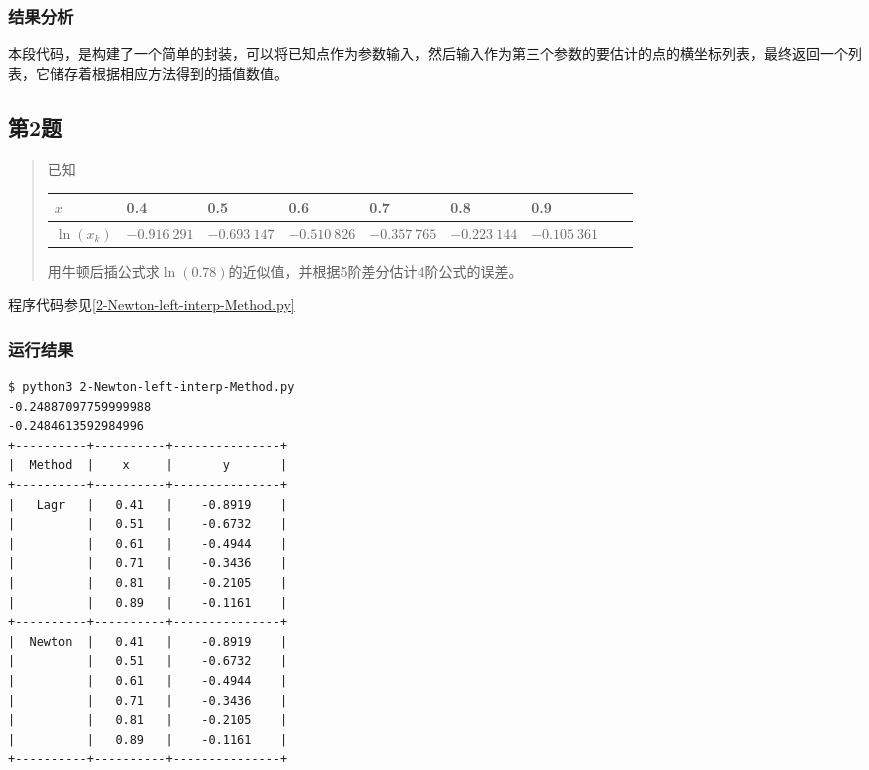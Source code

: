 \subsubsection{结果分析}

本段代码，是构建了一个简单的封装，可以将已知点作为参数输入，然后输入作为第三个参数的要估计的点的横坐标列表，最终返回一个列表，它储存着根据相应方法得到的插值数值。


\subsection{第2题}
\begin{quote}
    {\kaishu
        已知
        \begin{table}[H]
            \centering
            \begin{tabular}{@{}lllllllll@{}}
            \toprule
                $x$ & 0.4 & 0.5 & 0.6 & 0.7 & 0.8 & 0.9 \\ \midrule
                $\ln(x_k)$ & $-0.916\ 291$ & $-0.693\ 147$ & $-0.510\ 826$ & $-0.357\ 765$ & $-0.223\ 144$ & $-0.105\ 361$\\ \bottomrule
            \end{tabular}%
        \end{table}
        用牛顿后插公式求$\ln⁡(0.78)$的近似值，并根据5阶差分估计4阶公式的误差。
    }
\end{quote}

程序代码参见\ref{2-Newton-left-interp-Method.py}

\subsubsection{运行结果}

\begin{lstlisting}[style = bash]
$ python3 2-Newton-left-interp-Method.py 
-0.24887097759999988
-0.2484613592984996
+----------+----------+---------------+
|  Method  |    x     |       y       |
+----------+----------+---------------+
|   Lagr   |   0.41   |    -0.8919    |
|          |   0.51   |    -0.6732    |
|          |   0.61   |    -0.4944    |
|          |   0.71   |    -0.3436    |
|          |   0.81   |    -0.2105    |
|          |   0.89   |    -0.1161    |
+----------+----------+---------------+
|  Newton  |   0.41   |    -0.8919    |
|          |   0.51   |    -0.6732    |
|          |   0.61   |    -0.4944    |
|          |   0.71   |    -0.3436    |
|          |   0.81   |    -0.2105    |
|          |   0.89   |    -0.1161    |
+----------+----------+---------------+
\end{lstlisting}

